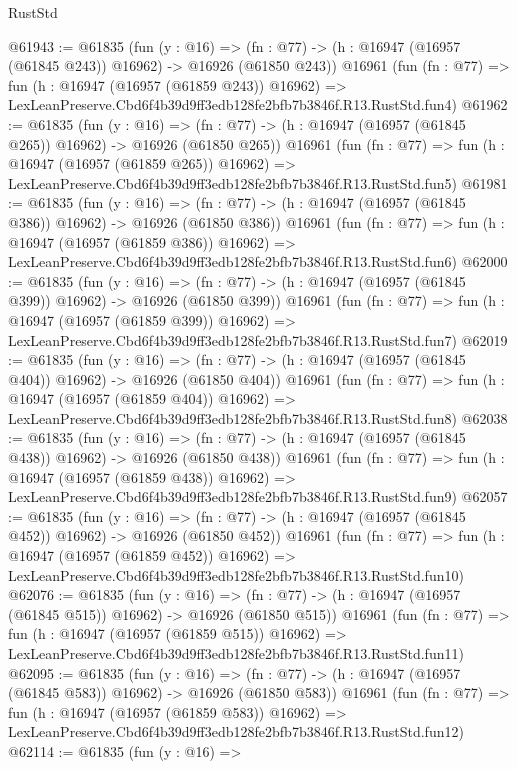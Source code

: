 \begin{lexlean}{RustStd}
\begin{coremodule}
@61943 := @61835
    (fun (y : @16) =>
    (fn : @77) -> (h : @16947 (@16957 (@61845 @243)) @16962) -> @16926 (@61850 @243))
    @16961
    (fun (fn : @77) =>
    fun (h : @16947 (@16957 (@61859 @243)) @16962) =>
    LexLeanPreserve.Cbd6f4b39d9ff3edb128fe2bfb7b3846f.R13.RustStd.fun4)
@61962 := @61835
    (fun (y : @16) =>
    (fn : @77) -> (h : @16947 (@16957 (@61845 @265)) @16962) -> @16926 (@61850 @265))
    @16961
    (fun (fn : @77) =>
    fun (h : @16947 (@16957 (@61859 @265)) @16962) =>
    LexLeanPreserve.Cbd6f4b39d9ff3edb128fe2bfb7b3846f.R13.RustStd.fun5)
@61981 := @61835
    (fun (y : @16) =>
    (fn : @77) -> (h : @16947 (@16957 (@61845 @386)) @16962) -> @16926 (@61850 @386))
    @16961
    (fun (fn : @77) =>
    fun (h : @16947 (@16957 (@61859 @386)) @16962) =>
    LexLeanPreserve.Cbd6f4b39d9ff3edb128fe2bfb7b3846f.R13.RustStd.fun6)
@62000 := @61835
    (fun (y : @16) =>
    (fn : @77) -> (h : @16947 (@16957 (@61845 @399)) @16962) -> @16926 (@61850 @399))
    @16961
    (fun (fn : @77) =>
    fun (h : @16947 (@16957 (@61859 @399)) @16962) =>
    LexLeanPreserve.Cbd6f4b39d9ff3edb128fe2bfb7b3846f.R13.RustStd.fun7)
@62019 := @61835
    (fun (y : @16) =>
    (fn : @77) -> (h : @16947 (@16957 (@61845 @404)) @16962) -> @16926 (@61850 @404))
    @16961
    (fun (fn : @77) =>
    fun (h : @16947 (@16957 (@61859 @404)) @16962) =>
    LexLeanPreserve.Cbd6f4b39d9ff3edb128fe2bfb7b3846f.R13.RustStd.fun8)
@62038 := @61835
    (fun (y : @16) =>
    (fn : @77) -> (h : @16947 (@16957 (@61845 @438)) @16962) -> @16926 (@61850 @438))
    @16961
    (fun (fn : @77) =>
    fun (h : @16947 (@16957 (@61859 @438)) @16962) =>
    LexLeanPreserve.Cbd6f4b39d9ff3edb128fe2bfb7b3846f.R13.RustStd.fun9)
@62057 := @61835
    (fun (y : @16) =>
    (fn : @77) -> (h : @16947 (@16957 (@61845 @452)) @16962) -> @16926 (@61850 @452))
    @16961
    (fun (fn : @77) =>
    fun (h : @16947 (@16957 (@61859 @452)) @16962) =>
    LexLeanPreserve.Cbd6f4b39d9ff3edb128fe2bfb7b3846f.R13.RustStd.fun10)
@62076 := @61835
    (fun (y : @16) =>
    (fn : @77) -> (h : @16947 (@16957 (@61845 @515)) @16962) -> @16926 (@61850 @515))
    @16961
    (fun (fn : @77) =>
    fun (h : @16947 (@16957 (@61859 @515)) @16962) =>
    LexLeanPreserve.Cbd6f4b39d9ff3edb128fe2bfb7b3846f.R13.RustStd.fun11)
@62095 := @61835
    (fun (y : @16) =>
    (fn : @77) -> (h : @16947 (@16957 (@61845 @583)) @16962) -> @16926 (@61850 @583))
    @16961
    (fun (fn : @77) =>
    fun (h : @16947 (@16957 (@61859 @583)) @16962) =>
    LexLeanPreserve.Cbd6f4b39d9ff3edb128fe2bfb7b3846f.R13.RustStd.fun12)
@62114 := @61835
    (fun (y : @16) =>

\end{coremodule}
\end{lexlean}
